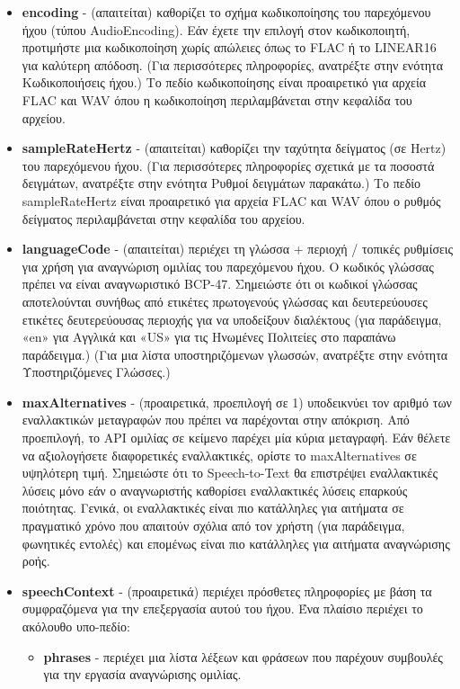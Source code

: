 \documentclass[oneside, 12pt]{book}
\begin{document}
\begin{itemize}
  \item \textbf{encoding} - (απαιτείται) καθορίζει το σχήμα κωδικοποίησης του παρεχόμενου ήχου (τύπου AudioEncoding). Εάν έχετε την επιλογή στον κωδικοποιητή, προτιμήστε μια κωδικοποίηση χωρίς απώλειες όπως το FLAC ή το LINEAR16 για καλύτερη απόδοση. (Για περισσότερες πληροφορίες, ανατρέξτε στην ενότητα Κωδικοποιήσεις ήχου.) Το πεδίο κωδικοποίησης είναι προαιρετικό για αρχεία FLAC και WAV όπου η κωδικοποίηση περιλαμβάνεται στην κεφαλίδα του αρχείου.
  \item \textbf{sampleRateHertz} - (απαιτείται) καθορίζει την ταχύτητα δείγματος (σε Hertz) του παρεχόμενου ήχου. (Για περισσότερες πληροφορίες σχετικά με τα ποσοστά δειγμάτων, ανατρέξτε στην ενότητα Ρυθμοί δειγμάτων παρακάτω.) Το πεδίο sampleRateHertz είναι προαιρετικό για αρχεία FLAC και WAV όπου ο ρυθμός δείγματος περιλαμβάνεται στην κεφαλίδα του αρχείου.
  \item \textbf{languageCode} - (απαιτείται) περιέχει τη γλώσσα + περιοχή / τοπικές ρυθμίσεις για χρήση για αναγνώριση ομιλίας του παρεχόμενου ήχου. Ο κωδικός γλώσσας πρέπει να είναι αναγνωριστικό BCP-47. Σημειώστε ότι οι κωδικοί γλώσσας αποτελούνται συνήθως από ετικέτες πρωτογενούς γλώσσας και δευτερεύουσες ετικέτες δευτερεύουσας περιοχής για να υποδείξουν διαλέκτους (για παράδειγμα, «en» για Αγγλικά και «US» για τις Ηνωμένες Πολιτείες στο παραπάνω παράδειγμα.) (Για μια λίστα υποστηριζόμενων γλωσσών, ανατρέξτε στην ενότητα Υποστηριζόμενες Γλώσσες.)
  \item \textbf{maxAlternatives} - (προαιρετικά, προεπιλογή σε 1) υποδεικνύει τον αριθμό των εναλλακτικών μεταγραφών που πρέπει να παρέχονται στην απόκριση. Από προεπιλογή, το API ομιλίας σε κείμενο παρέχει μία κύρια μεταγραφή. Εάν θέλετε να αξιολογήσετε διαφορετικές εναλλακτικές, ορίστε το maxAlternatives σε υψηλότερη τιμή. Σημειώστε ότι το Speech-to-Text θα επιστρέψει εναλλακτικές λύσεις μόνο εάν ο αναγνωριστής καθορίσει εναλλακτικές λύσεις επαρκούς ποιότητας. Γενικά, οι εναλλακτικές είναι πιο κατάλληλες για αιτήματα σε πραγματικό χρόνο που απαιτούν σχόλια από τον χρήστη (για παράδειγμα, φωνητικές εντολές) και επομένως είναι πιο κατάλληλες για αιτήματα αναγνώρισης ροής.
  \item \textbf{speechContext} - (προαιρετικά) περιέχει πρόσθετες πληροφορίες με βάση τα συμφραζόμενα για την επεξεργασία αυτού του ήχου. Ένα πλαίσιο περιέχει το ακόλουθο υπο-πεδίο:
  \begin{itemize}
    \item \textbf{phrases} - περιέχει μια λίστα λέξεων και φράσεων που παρέχουν συμβουλές για την εργασία αναγνώρισης ομιλίας.
  \end{itemize}
\end{itemize}
\end{document}
